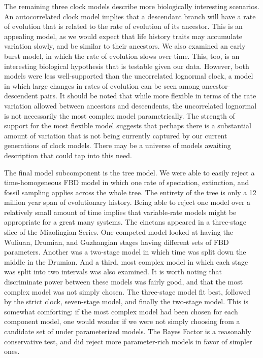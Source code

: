 \documentclass{article}
\begin{document}
The remaining three clock models describe more biologically interesting scenarios.
An autocorrelated clock model implies that a descendant branch will have a rate of evolution that is related to the rate of evolution of its ancestor.
This is an appealing model, as we would expect that life history traits may accumulate variation slowly, and be similar to their ancestors. 
We also examined an early burst model, in which the rate of evolution slows over time.
This, too, is an interesting biological hypothesis that is testable given our data.
However, both models were less well-supported than the uncorrelated lognormal clock,
a model in which large changes in rates of evolution can be seen among ancestor-descendent pairs.
It should be noted that while more flexible in terms of the rate variation allowed between ancestors and descendents, the uncorrelated lognormal is not necessarily the most complex model parametrically. 
The strength of support for the most flexible model suggests that perhaps there is a substantial amount of variation that is not being currently captured by our current generations of clock models.
There may be a universe of models awaiting description that could tap into this need.

The final model subcomponent is the tree model.
We were able to easily reject a time-homogeneous FBD model in which one rate of speciation, extinction, and fossil sampling applies across the whole tree.
The entirety of the tree is only a 12 million year span of evolutionary history.
Being able to reject one model over a relatively small amount of time implies that variable-rate models might be appropriate for a great many systems.
The cinctans appeared in a three-stage slice of the Miaolingian Series. 
One competed model looked at having the Wuliuan, Drumian, and Guzhangian stages having different sets of FBD parameters. 
Another was  a two-stage model in which time was split down the middle in the Drumian.
And a third, most complex model in which each stage was split into two intervals was also examined. 
It is worth noting that discriminate power between these models was fairly good, and that the most complex model was not simply chosen.
The three-stage model fit best, followed by the strict clock, seven-stage model, and finally the two-stage model. 
This is somewhat comforting: if the most complex model had been chosen for each component model, one would wonder if we were not simply choosing from a candidate set of under parameterized models. 
The Bayes Factor is a reasonably conservative test, and did reject more parameter-rich models in favor of simpler ones.
\end{document}
